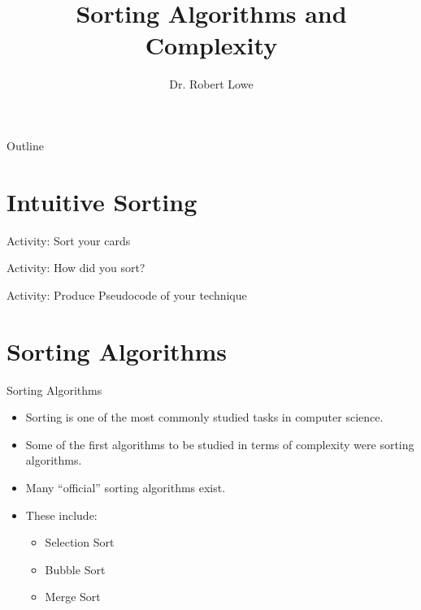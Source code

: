 \documentclass[handout]{beamer}
\title{Sorting Algorithms and Complexity}
\author{Dr. Robert Lowe\\}
\institute[Maryville College] %
{
  Division of Mathematics and Computer Science\\
  Maryville College
}
\date[]{}
\begin{document}
\begin{frame}
  \titlepage
\end{frame}

\begin{frame}{Outline}
  \tableofcontents
\end{frame}





\section{Intuitive Sorting}
\begin{frame}{Activity: Sort your cards}
\end{frame}

\begin{frame}{Activity: How did you sort?}
\end{frame}

\begin{frame}{Activity: Produce Pseudocode of your technique}
\end{frame}

\section{Sorting Algorithms}
\begin{frame}{Sorting Algorithms}
\begin{itemize}[<+->]
    \item Sorting is one of the most commonly studied tasks in
        computer science.
    \item Some of the first algorithms to be studied in terms of
        complexity were sorting algorithms.
    \item Many ``official'' sorting algorithms exist.
    \item These include:
    \begin{itemize}
        \item Selection Sort
        \item Bubble Sort
        \item Merge Sort
    \end{itemize}
\end{itemize}
\end{frame}
\end{document}
